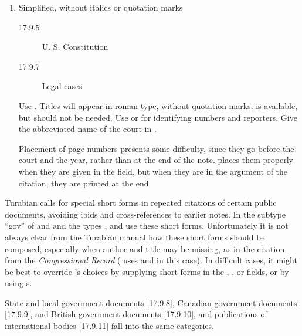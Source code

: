 \documentclass{ltxdockit}[2010/02/12]
\begin{document}
{\begin{enumerate}
\begin{enumerate}
		\item Simplified, without italics or quotation marks

		\begin{description}
			\item [17.9.5] U. S. Constitution 
			\item [17.9.7] Legal cases 
		\end{description}
		
			Use . Titles will appear in roman type, without quotation marks.  is available, but should not be needed. Use  or  for identifying numbers and reporters. Give the abbreviated name of the court in .\autocites[][]{2000united-states-v}
			
			Placement of page numbers presents some difficulty, since they go before the court and the year, rather than at the end of the note.  places them properly when they are given in the  field, but when they are in the  argument of the citation, they are printed at the end.
						
	\end{enumerate}
\end{enumerate}

Turabian calls for special short forms in repeated citations of certain public documents, avoiding ibids and cross-references to earlier notes. In  the subtype ``gov'' of  and  and the types ,  and  use these short forms.\autocites{hj15eh, u.s.-congress193015, 1907house-miscellan, u.-s.-congress.-house1985food-security, 1970national-enviro, 2000united-states-v}
Unfortunately it is not always clear from the Turabian manual how these short forms should be composed, especially when author and title may be missing, as in the citation from the \emph{Congressional Record} ( uses  and  in this case). In difficult cases, it might be best to override 's choices by supplying short forms in the , , or  fields, or by using s.

State and local government documents [17.9.8], Canadian government documents [17.9.9], and British government documents [17.9.10], and publications of international bodies [17.9.11] fall into the same categories.

}
\end{document}

